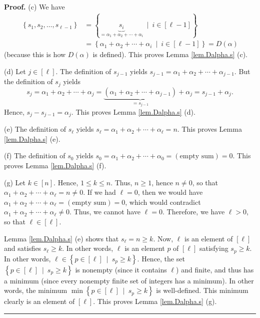 \documentclass[numbers=enddot,12pt,final,onecolumn,notitlepage,abstracton]{scrartcl}
\theoremstyle{definition}
\newenvironment{proof}[1][Proof]{\noindent\textbf{#1.} }{\ \rule{0.5em}{0.5em}}
\newenvironment{verlong}{}{}
\begin{document}
\begin{verlong}
\begin{footnotesize}
\begin{proof}
(c) We have%
\begin{align*}
\left\{  s_{1},s_{2},\ldots,s_{\ell-1}\right\}   &  =\left\{
\underbrace{s_{i}}_{=\alpha_{1}+\alpha_{2}+\cdots+\alpha_{i}}\ \mid
\ i\in\left[  \ell-1\right]  \right\} \\
&  =\left\{  \alpha_{1}+\alpha_{2}+\cdots+\alpha_{i}\ \mid\ i\in\left[
\ell-1\right]  \right\}  =D\left(  \alpha\right)
\end{align*}
(because this is how $D\left(  \alpha\right)  $ is defined). This proves Lemma
\ref{lem.Dalpha.s} (c).

(d) Let $j\in\left[  \ell\right]  $. The definition of $s_{j-1}$ yields
$s_{j-1}=\alpha_{1}+\alpha_{2}+\cdots+\alpha_{j-1}$. But the definition of
$s_{j}$ yields%
\[
s_{j}=\alpha_{1}+\alpha_{2}+\cdots+\alpha_{j}=\underbrace{\left(  \alpha
_{1}+\alpha_{2}+\cdots+\alpha_{j-1}\right)  }_{=s_{j-1}}+\alpha_{j}%
=s_{j-1}+\alpha_{j}.
\]
Hence, $s_{j}-s_{j-1}=\alpha_{j}$. This proves Lemma \ref{lem.Dalpha.s} (d).

(e) The definition of $s_{\ell}$ yields $s_{\ell}=\alpha_{1}+\alpha_{2}%
+\cdots+\alpha_{\ell}=n$. This proves Lemma \ref{lem.Dalpha.s} (e).

(f) The definition of $s_{0}$ yields $s_{0}=\alpha_{1}+\alpha_{2}%
+\cdots+\alpha_{0}=\left(  \text{empty sum}\right)  =0$. This proves Lemma
\ref{lem.Dalpha.s} (f).

(g) Let $k\in\left[  n\right]  $. Hence, $1\leq k\leq n$. Thus, $n\geq1$,
hence $n\neq0$, so that $\alpha_{1}+\alpha_{2}+\cdots+\alpha_{\ell}=n\neq0$.
If we had $\ell=0$, then we would have $\alpha_{1}+\alpha_{2}+\cdots
+\alpha_{\ell}=\left(  \text{empty sum}\right)  =0$, which would contradict
$\alpha_{1}+\alpha_{2}+\cdots+\alpha_{\ell}\neq0$. Thus, we cannot have
$\ell=0$. Therefore, we have $\ell>0$, so that $\ell\in\left[  \ell\right]  $.

Lemma \ref{lem.Dalpha.s} (e) shows that $s_{\ell}=n\geq k$. Now, $\ell$ is an
element of $\left[  \ell\right]  $ and satisfies $s_{\ell}\geq k$. In other
words, $\ell$ is an element $p$ of $\left[  \ell\right]  $ satisfying
$s_{p}\geq k$. In other words, $\ell\in\left\{  p\in\left[  \ell\right]
\ \mid\ s_{p}\geq k\right\}  $. Hence, the set $\left\{  p\in\left[
\ell\right]  \ \mid\ s_{p}\geq k\right\}  $ is nonempty (since it contains
$\ell$) and finite, and thus has a minimum (since every nonempty finite set of
integers has a minimum). In other words, the minimum $\min\left\{  p\in\left[
\ell\right]  \ \mid\ s_{p}\geq k\right\}  $ is well-defined. This minimum
clearly is an element of $\left[  \ell\right]  $. This proves Lemma
\ref{lem.Dalpha.s} (g).
\end{proof}


\end{footnotesize}
\end{verlong}
\end{document}

